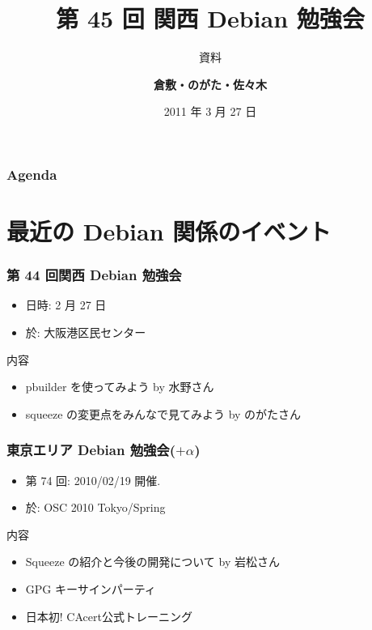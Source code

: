 \documentclass[cjk,dvipdfmx,12pt,%
hyperref={bookmarks=true,bookmarksnumbered=true,bookmarksopen=false,%
colorlinks=false,%
pdftitle={第 45 回 関西 Debian 勉強会},%
pdfauthor={倉敷・のがた・佐々木},%
pdfsubject={資料},%
}]{beamer}
\title{第 45 回 関西 Debian 勉強会}
\subtitle{{\scriptsize 資料}}
\author[佐々木 洋平]{{\large\bf 倉敷・のがた・佐々木}}
\institute[Debian JP]{{\normalsize\tt 関西 Debian 勉強会}}
\date{{\small 2011 年 3 月 27 日}}
\begin{document}
\settitleslide
\begin{frame}
\titlepage
\end{frame}
\setdefaultslide

\begin{frame}[fragile]
\frametitle{Agenda}
\tableofcontents
\end{frame}

\section{最近の Debian 関係のイベント}


\begin{frame}[fragile]
\frametitle{第 44 回関西 Debian 勉強会}

\begin{itemize}
\item 日時: 2 月 27 日
\item 於: 大阪港区民センター
\end{itemize}

\begin{block}{内容}
  \begin{itemize}
  \item pbuilder を使ってみよう by 水野さん
  \item squeeze の変更点をみんなで見てみよう by のがたさん
  \end{itemize}
\end{block}
\end{frame}

\begin{frame}[fragile]
  \frametitle{東京エリア Debian 勉強会($+\alpha$)}
  \begin{itemize}
  \item 第 74 回: 2010/02/19 開催.
  \item 於: OSC 2010 Tokyo/Spring
  \end{itemize}
  \begin{block}{内容}
    \begin{itemize}
    \item Squeeze の紹介と今後の開発について by 岩松さん
    \item GPG キーサインパーティ
    \item 日本初! CAcert公式トレーニング
    \end{itemize}
  \end{block}
\end{frame}
\end{document}
